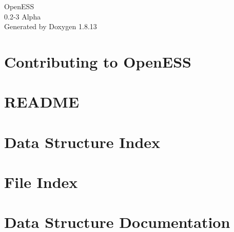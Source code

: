 \documentclass[twoside]{book}
\newcommand{\+}{\discretionary{\mbox{\scriptsize$\hookleftarrow$}}{}{}}
\newcommand{\clearemptydoublepage}{%
  \newpage{\pagestyle{empty}\cleardoublepage}%
}
\begin{document}
\hypersetup{pageanchor=false,
             bookmarksnumbered=true,
             pdfencoding=unicode
            }
\begin{titlepage}
\vspace*{7cm}
\begin{center}%
{\Large Open\+E\+SS \\[1ex]\large 0.\+2-\/3 Alpha }\\
\vspace*{1cm}
{\large Generated by Doxygen 1.8.13}\\
\end{center}
\end{titlepage}
\clearemptydoublepage
{}
\tableofcontents
\clearemptydoublepage
{}
\hypersetup{pageanchor=true}

\chapter{Contributing to Open\+E\+SS}
\label{md__c_o_n_t_r_i_b_u_t_i_n_g}

\chapter{R\+E\+A\+D\+ME}
\label{md__r_e_a_d_m_e}

\chapter{Data Structure Index}

\chapter{File Index}

\chapter{Data Structure Documentation}











\end{document}
